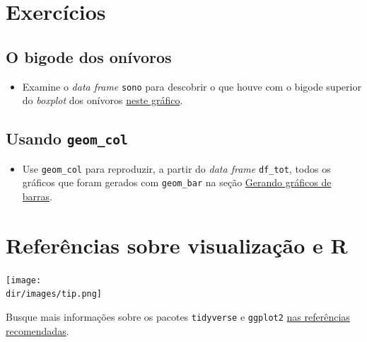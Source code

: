 \documentclass[
  11pt]{report}
\providecommand{\tightlist}{%
  \setlength{\itemsep}{0pt}\setlength{\parskip}{0pt}}
\newcommand{\dir}{/ssd/R/x86_64-pc-linux-gnu-library/4.1/fnaufelRmd/rmarkdown/resources}
\newenvironment{rmdtip}
{
  \begin{mytip}
    \texttt{[image: \\dir/images/tip.png]}
    \tcblower
  }
  {
  \end{mytip}
}
\begin{document}
\hypertarget{exercuxedcios-4}{%
\section{Exercícios}\label{exercuxedcios-4}}

\hypertarget{o-bigode-dos-onuxedvoros}{%
\subsection{O bigode dos onívoros}\label{o-bigode-dos-onuxedvoros}}

\begin{itemize}
\tightlist
\item
  Examine o \emph{data frame} \texttt{sono} para descobrir o que houve com o bigode superior do \emph{boxplot} dos onívoros \protect\hyperlink{onivoros}{neste gráfico}.
\end{itemize}

\hypertarget{usando-geom_col}{%
\subsection{\texorpdfstring{Usando \texttt{geom\_col}}{Usando geom\_col}}\label{usando-geom_col}}

\begin{itemize}
\tightlist
\item
  Use \texttt{geom\_col} para reproduzir, a partir do \emph{data frame} \texttt{df\_tot}, todos os gráficos que foram gerados com \texttt{geom\_bar} na seção \protect\hyperlink{gerando-grux5cux25C3ux5cux25A1ficos-de-barras}{Gerando gráficos de barras}.
\end{itemize}

\hypertarget{section}{%
\subsection{}\label{section}}

\hypertarget{referuxeancias-sobre-visualizauxe7uxe3o-e-r}{%
\section{Referências sobre visualização e R}\label{referuxeancias-sobre-visualizauxe7uxe3o-e-r}}

\begin{rmdtip}
Busque mais informações sobre os pacotes \texttt{tidyverse} e \texttt{ggplot2} \protect\hyperlink{refrec}{nas referências recomendadas}.

\end{rmdtip}
\end{document}
